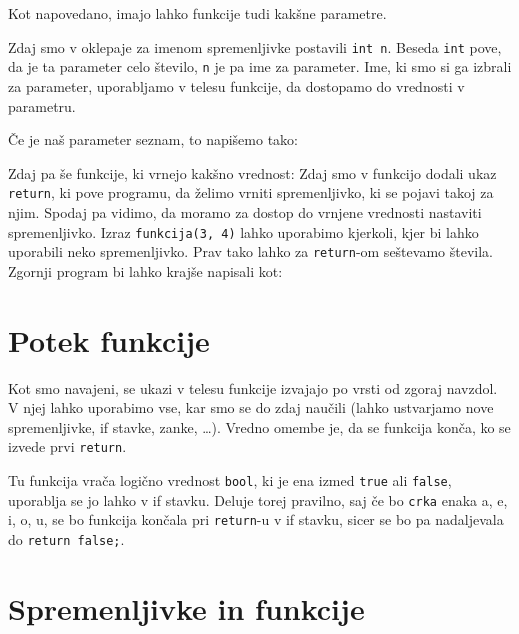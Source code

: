 \documentclass{book}
\begin{document}
Kot napovedano, imajo lahko funkcije tudi kakšne parametre.

Zdaj smo v oklepaje za imenom spremenljivke postavili \verb+int n+. Beseda
\verb+int+ pove, da je ta parameter celo število, \verb+n+ je pa ime za
parameter. Ime, ki smo si ga izbrali za parameter, uporabljamo v telesu
funkcije, da dostopamo do vrednosti v parametru.

Če je naš parameter seznam, to napišemo tako:

Zdaj pa še funkcije, ki vrnejo kakšno vrednost:
Zdaj smo v funkcijo dodali ukaz \verb+return+, ki pove programu, da želimo
vrniti spremenljivko, ki se pojavi takoj za njim. Spodaj pa vidimo, da moramo
za dostop do vrnjene vrednosti nastaviti spremenljivko. Izraz
\verb+funkcija(3, 4)+ lahko uporabimo kjerkoli, kjer bi lahko uporabili neko
spremenljivko. Prav tako lahko za \verb+return+-om seštevamo števila. Zgornji
program bi lahko krajše napisali kot:

\newpage
\section{Potek funkcije}

Kot smo navajeni, se ukazi v telesu funkcije izvajajo po vrsti od zgoraj
navzdol. V njej lahko uporabimo vse, kar smo se do zdaj naučili (lahko
ustvarjamo nove spremenljivke, if stavke, zanke, \ldots ). Vredno omembe je, da
se funkcija konča, ko se izvede prvi \verb+return+.

\begin{examples}
  Tu funkcija vrača logično vrednost \verb+bool+, ki je ena izmed \verb+true+ ali
  \verb+false+, uporablja se jo lahko v if stavku. Deluje torej pravilno, saj če
  bo \verb+crka+ enaka a, e, i, o, u, se bo funkcija končala pri \verb+return+-u
  v if stavku, sicer se bo pa nadaljevala do \verb+return false;+.
\end{examples}

\section{Spremenljivke in funkcije}
\end{document}
